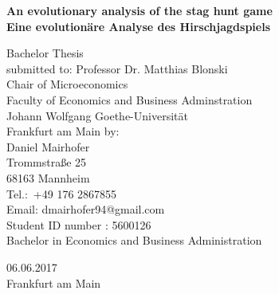 \thispagestyle{empty}
\vspace*{15mm}
\begin{center}
	\textbf{\Huge An evolutionary analysis of the stag hunt game}\\
    \vspace{5mm}
    \textbf{\large Eine evolutionäre Analyse des Hirschjagdspiels}\\
    \end{center}
\begin{center}
\vskip 0.5cm
	\large Bachelor Thesis \\	
\vskip 1.5cm	
	submitted to:
\vskip 1cm
Professor Dr. Matthias Blonski\\
Chair of Microeconomics\\
Faculty of Economics and Business Adminstration\\
Johann Wolfgang Goethe-Universität\\
Frankfurt am Main
\vskip 1cm
by:  \\
\vskip 0.5cm
Daniel Mairhofer\\
Trommstraße 25\\
68163 Mannheim\\
Tel.:\ +49 176 2867855 \\
Email: dmairhofer94@gmail.com\\
Student ID number : 5600126\\
Bachelor in Economics and Business Administration 
\end{center}
\vskip 1.5cm
\begin{center}
\large{06.06.2017} \\
\large{Frankfurt am Main}
\end{center}



